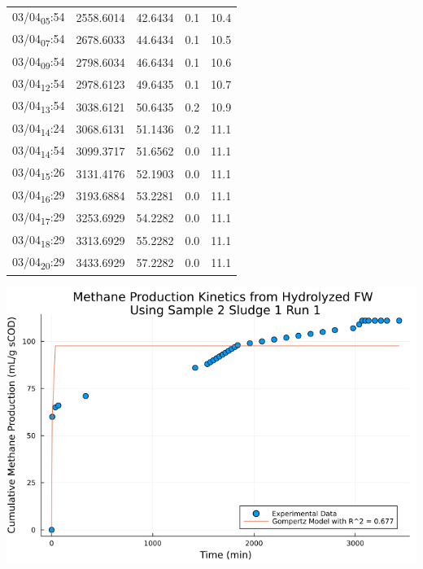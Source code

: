\documentclass[11pt]{article}
\begin{document}
\begin{center}
\begin{tabular}{lrrrr}
03/04\textsubscript{05}:54 & 2558.6014 & 42.6434 & 0.1 & 10.4\\[0pt]
03/04\textsubscript{07}:54 & 2678.6033 & 44.6434 & 0.1 & 10.5\\[0pt]
03/04\textsubscript{09}:54 & 2798.6034 & 46.6434 & 0.1 & 10.6\\[0pt]
03/04\textsubscript{12}:54 & 2978.6123 & 49.6435 & 0.1 & 10.7\\[0pt]
03/04\textsubscript{13}:54 & 3038.6121 & 50.6435 & 0.2 & 10.9\\[0pt]
03/04\textsubscript{14}:24 & 3068.6131 & 51.1436 & 0.2 & 11.1\\[0pt]
03/04\textsubscript{14}:54 & 3099.3717 & 51.6562 & 0.0 & 11.1\\[0pt]
03/04\textsubscript{15}:26 & 3131.4176 & 52.1903 & 0.0 & 11.1\\[0pt]
03/04\textsubscript{16}:29 & 3193.6884 & 53.2281 & 0.0 & 11.1\\[0pt]
03/04\textsubscript{17}:29 & 3253.6929 & 54.2282 & 0.0 & 11.1\\[0pt]
03/04\textsubscript{18}:29 & 3313.6929 & 55.2282 & 0.0 & 11.1\\[0pt]
03/04\textsubscript{20}:29 & 3433.6929 & 57.2282 & 0.0 & 11.1\\[0pt]
\end{tabular}
\end{center}


\begin{center}
\includegraphics[width=.9\linewidth]{../plots/BMPs/Hydrolyzed FW/methane_kinetics_hydrolysate_2_s1_r1_min.png}
\end{center}
\end{document}
